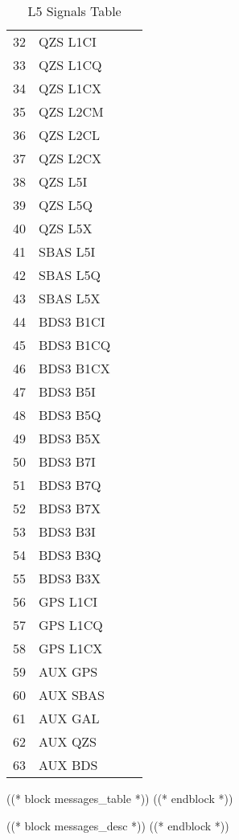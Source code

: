 \documentclass[9pt]{extarticle}
\numberwithin{table}{subsection}
\numberwithin{field}{subsection}
\begin{document}
\begin{table}[h]
\begin{tabular}{llrl}
    {32} & {QZS L1CI} \\
    {33} & {QZS L1CQ} \\
    {34} & {QZS L1CX} \\
    {35} & {QZS L2CM} \\
    {36} & {QZS L2CL} \\
    {37} & {QZS L2CX} \\
    {38} & {QZS L5I} \\
    {39} & {QZS L5Q} \\
    {40} & {QZS L5X} \\
    {41} & {SBAS L5I} \\
    {42} & {SBAS L5Q} \\
    {43} & {SBAS L5X} \\
    {44} & {BDS3 B1CI} \\
    {45} & {BDS3 B1CQ} \\
    {46} & {BDS3 B1CX} \\
    {47} & {BDS3 B5I} \\
    {48} & {BDS3 B5Q} \\
    {49} & {BDS3 B5X} \\
    {50} & {BDS3 B7I} \\
    {51} & {BDS3 B7Q} \\
    {52} & {BDS3 B7X} \\
    {53} & {BDS3 B3I} \\
    {54} & {BDS3 B3Q} \\
    {55} & {BDS3 B3X} \\
    {56} & {GPS L1CI} \\
    {57} & {GPS L1CQ} \\
    {58} & {GPS L1CX} \\
    {59} & {AUX GPS} \\
    {60} & {AUX SBAS} \\
    {61} & {AUX GAL} \\
    {62} & {AUX QZS} \\
    {63} & {AUX BDS} \\
    \bottomrule
  \end{tabular}
  \caption{L5 Signals Table}
  \label{tab:example_breakdown}
\end{table}

((* block messages_table *))
((* endblock *))

((* block messages_desc *))
((* endblock *))
\end{document}
